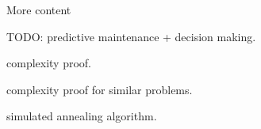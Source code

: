 \documentclass[usenames,dvipsnames]{beamer}
\begin{document}


\appendix

\begin{frame}{}
  \centering
  More content
\end{frame}

\begin{frame}{}
  \centering
  TODO: predictive maintenance + decision making.
\end{frame}

\begin{frame}{}
  \centering
  complexity proof.
\end{frame}

\begin{frame}{}
  \centering
  complexity proof for similar problems.
\end{frame}

\begin{frame}{}
  \centering
  simulated annealing algorithm.
\end{frame}


\end{document}
